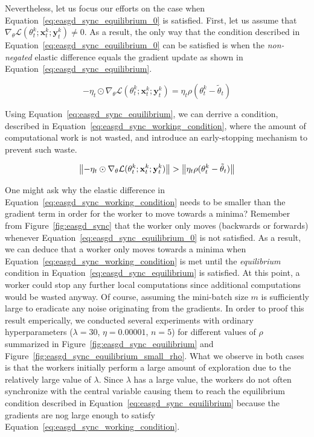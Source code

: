 Nevertheless, let us focus our efforts on the case when Equation~\ref{eq:easgd_sync_equilibrium_0} is satisfied. First, let us assume that $\nabla_\theta \mathcal{L}(\theta^k_t;\mathbf{x}^k_t;\mathbf{y}^k_t) \neq 0$. As a result, the only way that the condition described in Equation~\ref{eq:easgd_sync_equilibrium_0} can be satisfied is when the \emph{non-negated} elastic difference equals the gradient update as shown in Equation~\ref{eq:easgd_sync_equilibrium}.

\begin{equation}
  \label{eq:easgd_sync_equilibrium}
  -\eta_t \odot \nabla_\theta \mathcal{L}(\theta^k_t;\mathbf{x}^k_t;\mathbf{y}^k_t) = \eta_t\rho(\theta^k_t - \tilde{\theta}_t)
\end{equation}

Using Equation~\ref{eq:easgd_sync_equilibrium}, we can derrive a condition, described in Equation~\ref{eq:easgd_sync_working_condition}, where the amount of computational work is not wasted, and introduce an early-stopping mechanism to prevent such waste.

\begin{equation}
  \label{eq:easgd_sync_working_condition}
  \left\lVert-\eta_t \odot \nabla_\theta \mathcal{L}(\theta^k_t;\mathbf{x}^k_t;\mathbf{y}^k_t)\right\rVert > \left\lVert\eta_t\rho(\theta^k_t - \tilde{\theta}_t)\right\rVert
\end{equation}

One might ask why the elastic difference in Equation~\ref{eq:easgd_sync_working_condition} needs to be smaller than the gradient term in order for the worker to move towards a minima? Remember from Figure~\ref{fig:easgd_sync} that the worker only moves (backwards or forwards) whenever Equation~\ref{eq:easgd_sync_equilibrium_0} is not satisfied. As a result, we can deduce that a worker only moves towards a minima when Equation~\ref{eq:easgd_sync_working_condition} is met until the \emph{equilibrium} condition in Equation~\ref{eq:easgd_sync_equilibrium} is satisfied. At this point, a worker could stop any further local computations since additional computations would be wasted anyway. Of course, assuming the mini-batch size $m$ is sufficiently large to eradicate any noise originating from the gradients. In order to proof this result emperically, we conducted several experiments with ordinary hyperparameters ($\lambda = 30$, $\eta = 0.00001$, $n = 5$) for different values of $\rho$ summarized in Figure~\ref{fig:easgd_sync_equilibrium} and Figure~\ref{fig:easgd_sync_equilibrium_small_rho}. What we observe in both cases is that the workers initially perform a large amount of exploration due to the relatively large value of $\lambda$. Since $\lambda$ has a large value, the workers do not often synchronize with the central variable causing them to reach the equilibrium condition described in Equation~\ref{eq:easgd_sync_equilibrium} because the gradients are nog large enough to satisfy Equation~\ref{eq:easgd_sync_working_condition}.\\

